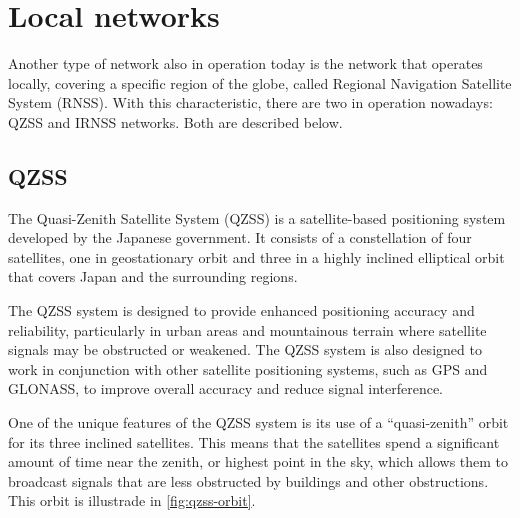 \section{Local networks}

Another type of network also in operation today is the network that operates locally, covering a specific region of the globe, called Regional Navigation Satellite System (RNSS). With this characteristic, there are two in operation nowadays: QZSS and IRNSS networks. Both are described below.

\subsection{QZSS}



The Quasi-Zenith Satellite System (QZSS) \cite{qzss} is a satellite-based positioning system developed by the Japanese government. It consists of a constellation of four satellites, one in geostationary orbit and three in a highly inclined elliptical orbit that covers Japan and the surrounding regions.

The QZSS system is designed to provide enhanced positioning accuracy and reliability, particularly in urban areas and mountainous terrain where satellite signals may be obstructed or weakened. The QZSS system is also designed to work in conjunction with other satellite positioning systems, such as GPS and GLONASS, to improve overall accuracy and reduce signal interference.

One of the unique features of the QZSS system is its use of a ``quasi-zenith'' orbit for its three inclined satellites. This means that the satellites spend a significant amount of time near the zenith, or highest point in the sky, which allows them to broadcast signals that are less obstructed by buildings and other obstructions. This orbit is illustrade in \autoref{fig:qzss-orbit}.

